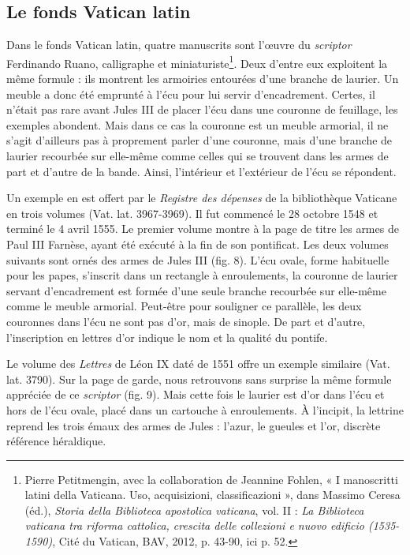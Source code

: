 \documentclass[12pt,twoside,openany]{book}
\begin{document}
\subsection{Le fonds Vatican latin}

Dans le fonds Vatican latin, quatre manuscrits sont l’œuvre du \textit{scriptor} Ferdinando Ruano, calligraphe et miniaturiste\footnote{Pierre Petitmengin, avec la collaboration de Jeannine Fohlen, « I manoscritti latini della Vaticana. Uso, acquisizioni, classificazioni », dans Massimo Ceresa (éd.), \textit{Storia della Biblioteca apostolica vaticana}, vol. II :\textit{ La Biblioteca vaticana tra riforma cattolica, crescita delle collezioni e nuovo edificio (1535-1590)}, Cité du Vatican, BAV, 2012, p. 43-90, ici p. 52.}. Deux d’entre eux exploitent la même formule : ils montrent les armoiries entourées d’une branche de laurier. Un meuble a donc été emprunté à l’écu pour lui servir d’encadrement. Certes, il n’était pas rare avant Jules III de placer l’écu dans une couronne de feuillage, les exemples abondent. Mais dans ce cas la couronne est un meuble armorial, il ne s’agit d’ailleurs pas à proprement parler d’une couronne, mais d’une branche de laurier recourbée sur elle-même comme celles qui se trouvent dans les armes de part et d’autre de la bande. Ainsi, l’intérieur et l’extérieur de l’écu se répondent.

Un exemple en est offert par le \textit{Registre des dépenses} de la bibliothèque Vaticane en trois volumes (Vat. lat. 3967-3969). Il fut commencé le 28 octobre 1548 et terminé le 4 avril 1555. Le premier volume montre à la page de titre les armes de Paul III Farnèse, ayant été exécuté à la fin de son pontificat. Les deux volumes suivants sont ornés des armes de Jules III (fig. 8). L’écu ovale, forme habituelle pour les papes, s’inscrit dans un rectangle à enroulements, la couronne de laurier servant d’encadrement est formée d’une seule branche recourbée sur elle-même comme le meuble armorial. Peut-être pour souligner ce parallèle, les deux couronnes dans l’écu ne sont pas d’or, mais de sinople. De part et d’autre, l’inscription en lettres d’or indique le nom et la qualité du pontife.

Le volume des \textit{Lettres} de Léon IX daté de 1551 offre un exemple similaire (Vat. lat. 3790). Sur la page de garde, nous retrouvons sans surprise la même formule appréciée de ce \textit{scriptor} (fig. 9). Mais cette fois le laurier est d’or dans l’écu et hors de l’écu ovale, placé dans un cartouche à enroulements. À l’incipit, la lettrine reprend les trois émaux des armes de Jules : l’azur, le gueules et l’or, discrète référence héraldique.
\end{document}

